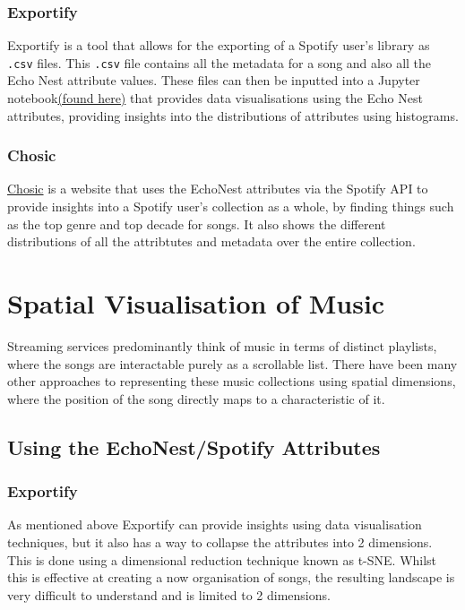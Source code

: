 \subsubsection{Exportify}
Exportify is a tool that allows for the exporting of a Spotify user's library as \texttt{.csv} files. This \texttt{.csv} file contains all the metadata for a song and also all the Echo Nest attribute values. These files can then be inputted into a Jupyter notebook\href{https://github.com/pavelkomarov/exportify/blob/master/taste_analysis.ipynb}{(found here)} that provides data visualisations using the Echo Nest attributes, providing insights into the distributions of attributes using histograms.

\subsubsection{Chosic}
\href{https://www.chosic.com/spotify-listening-stats}{Chosic} is a website that uses the EchoNest attributes via the Spotify API to provide insights into a Spotify user's collection as a whole, by finding things such as the top genre and top decade for songs. It also shows the different distributions of all the attribtutes and metadata over the entire collection.

\section{Spatial Visualisation of Music}
Streaming services predominantly think of music in terms of distinct playlists, where the songs are interactable purely as a scrollable list. There have been many other approaches to representing these music collections using spatial dimensions, where the position of the song directly maps to a characteristic of it.

\subsection{Using the EchoNest/Spotify Attributes}
\subsubsection{Exportify}
As mentioned above Exportify can provide insights using data visualisation techniques, but it also has a way to collapse the attributes into 2 dimensions. This is done using a dimensional reduction technique known as t-SNE. Whilst this is effective at creating a now organisation of songs, the resulting landscape is very difficult to understand and is limited to 2 dimensions.

